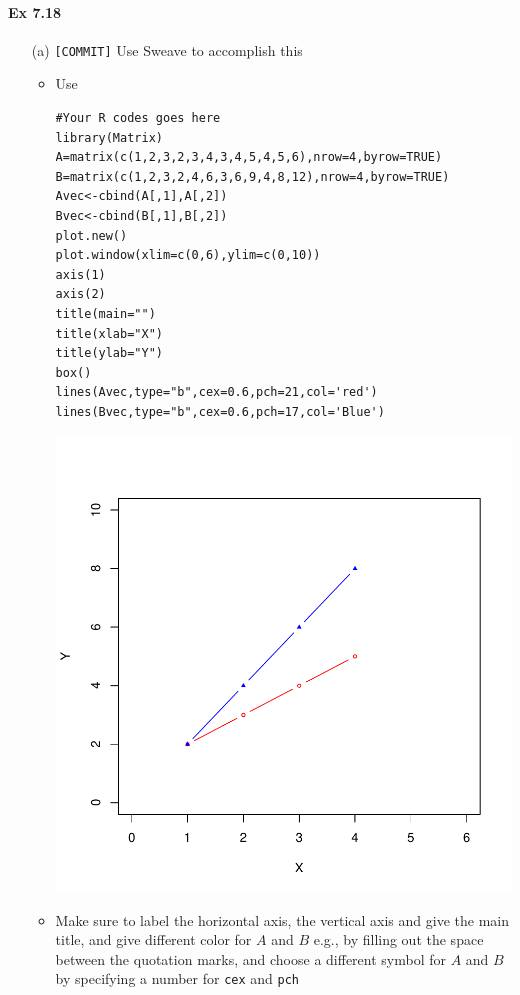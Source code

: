 \documentclass[12pt]{article}
\begin{document}
\paragraph{Ex 7.18}
\begin{itemize}
    \item[(a)] \verb+[COMMIT]+ Use Sweave to accomplish this
        \begin{itemize}
            \item Use 
\begin{lstlisting}
#Your R codes goes here
library(Matrix)
A=matrix(c(1,2,3,2,3,4,3,4,5,4,5,6),nrow=4,byrow=TRUE)
B=matrix(c(1,2,3,2,4,6,3,6,9,4,8,12),nrow=4,byrow=TRUE)
Avec<-cbind(A[,1],A[,2])
Bvec<-cbind(B[,1],B[,2])
plot.new()
plot.window(xlim=c(0,6),ylim=c(0,10))
axis(1)
axis(2)
title(main="")
title(xlab="X")
title(ylab="Y")
box()
lines(Avec,type="b",cex=0.6,pch=21,col='red')
lines(Bvec,type="b",cex=0.6,pch=17,col='Blue')
\end{lstlisting}


\includegraphics{ywu67HW3-001}

            \item Make sure to label the horizontal axis, the vertical axis
                and give the main title, and give different color for $A$ and
                $B$ e.g., by filling out the space
                between the quotation marks, and choose a different symbol for
                $A$ and $B$ by specifying a number for \verb+cex+ and
                \verb+pch+



\end{itemize}
\end{itemize}
\end{document}
